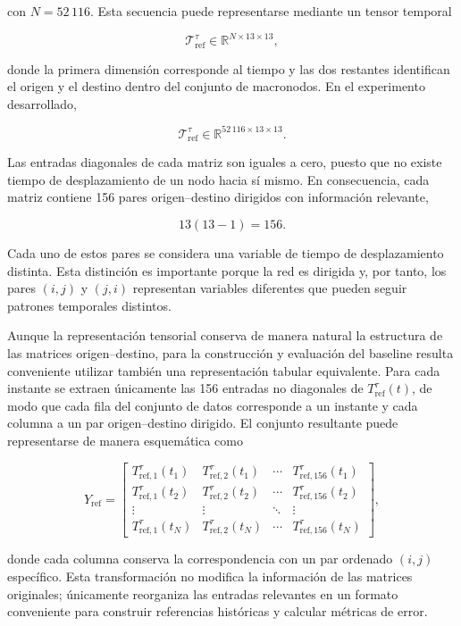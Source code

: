 \documentclass[11pt]{article}
\begin{document}
con $N=52\,116$. Esta secuencia puede representarse mediante un tensor temporal

\[
\mathcal{T}^{\tau}_{\mathrm{ref}}
\in
\mathbb{R}^{N\times13\times13},
\]

donde la primera dimensión corresponde al tiempo y las dos restantes identifican el origen y el destino dentro del conjunto de macronodos. En el experimento desarrollado,

\[
\mathcal{T}^{\tau}_{\mathrm{ref}}
\in
\mathbb{R}^{52\,116\times13\times13}.
\]

Las entradas diagonales de cada matriz son iguales a cero, puesto que no existe tiempo de desplazamiento de un nodo hacia sí mismo. En consecuencia, cada matriz contiene 156 pares origen--destino dirigidos con información relevante,

\[
13(13-1)=156.
\]

Cada uno de estos pares se considera una variable de tiempo de desplazamiento distinta. Esta distinción es importante porque la red es dirigida y, por tanto, los pares $(i,j)$ y $(j,i)$ representan variables diferentes que pueden seguir patrones temporales distintos.

Aunque la representación tensorial conserva de manera natural la estructura de las matrices origen--destino, para la construcción y evaluación del baseline resulta conveniente utilizar también una representación tabular equivalente. Para cada instante se extraen únicamente las 156 entradas no diagonales de $T^{\tau}_{\mathrm{ref}}(t)$, de modo que cada fila del conjunto de datos corresponde a un instante y cada columna a un par origen--destino dirigido. El conjunto resultante puede representarse de manera esquemática como

\[
Y_{\mathrm{ref}}
=
\begin{bmatrix}
T^{\tau}_{\mathrm{ref},1}(t_1) &
T^{\tau}_{\mathrm{ref},2}(t_1) &
\cdots &
T^{\tau}_{\mathrm{ref},156}(t_1)
\\
T^{\tau}_{\mathrm{ref},1}(t_2) &
T^{\tau}_{\mathrm{ref},2}(t_2) &
\cdots &
T^{\tau}_{\mathrm{ref},156}(t_2)
\\
\vdots & \vdots & \ddots & \vdots \\
T^{\tau}_{\mathrm{ref},1}(t_N) &
T^{\tau}_{\mathrm{ref},2}(t_N) &
\cdots &
T^{\tau}_{\mathrm{ref},156}(t_N)
\end{bmatrix},
\]

donde cada columna conserva la correspondencia con un par ordenado $(i,j)$ específico. Esta transformación no modifica la información de las matrices originales; únicamente reorganiza las entradas relevantes en un formato conveniente para construir referencias históricas y calcular métricas de error.
\end{document}
